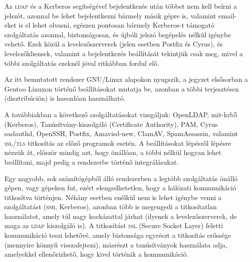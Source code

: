 Az \textsc{ldap} és a Kerberos segítségével bejelentkezés után többet nem kell beírni a jelszót, azonnal be lehet
bejelentkezni bármely másik gépre is, valamint email-eket is el lehet olvasni, egészen pontosan bármely Kerberos-t
támogató szolgáltatás azonnal, biztonságosan, és újbóli jelszó begépelés nélkül igénybe vehető. Ezek közül a
levelezőszerverek (jelen esetben Postfix és Cyrus), és levelezőkliensek, valamint a bejelentkezés beállítását tekintjük
csak meg, mivel a többi szolgáltatás ezeknél jóval ritkábban fordul elő.

Az itt bemutatott rendszer GNU/Linux alapokon nyugszik, a jegyzet elsősorban a Gentoo Linuxon történő beállításokat
mutatja be, azonban a többi terjesztésen (disztribúción) is hasonlóan használható.

A továbbiakban a következő szolgáltatásokat vizsgáljuk: 
OpenLDAP,
mit-krb5 (Kerberos),
Tanúsítvány-kiszolgáló (Certificate Authority),
PAM,
Cyrus saslauthd,
OpenSSH,
Postfix,
Amavisd-new,
ClamAV,
SpamAssassin,
valamint \textsc{ssl}/\textsc{tls} titkosítás az előző programok esetén. A beállításokat lépésről lépésre nézzük át, először mindig
azt, hogy önállóan, a többi nélkül hogyan lehet beállítani, majd pedig a rendszerbe történő integrálásukat.

Egy nagyobb, sok számítógépből álló rendszerben a legtöbb szolgáltatás önálló gépen, vagy gépeken fut, ezért
elengedhetetlen, hogy a hálózati kommunikáció titkosítva történjen. Néhány esetben enélkül nem is lehet igénybe venni a
szolgáltatást (\textsc{ssh}, Kerberos), azonban több is megengedi a titkosítatlan használatot, amely túl nagy
kockázattal járhat (ilyenek a levelezőszerverek, de maga az \textsc{ldap} kiszolgáló is). A titkosítást \textsc{ssl}
(Secure Socket Layer) feletti kommunikáció teszi lehetővé, amely biztonsága egyrészt a titkosítás erőssége (mennyire
könnyű visszafejteni), másrészt a tanúsítványok használata adja, amelyekkel ellenőrizhető, hogy kivel történik a
kommunikáció.

  
